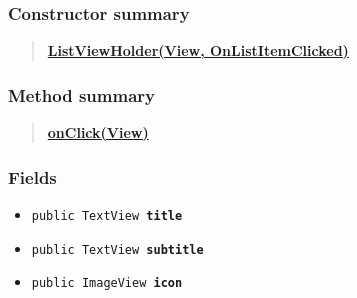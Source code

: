 \documentclass[11pt,a4paper]{report}
\begin{document}
{{{{{{{{{{{{{{{\subsubsection{Constructor summary}{
\begin{verse}
\hyperlink{edu.kit.pse17.go_app.RecyclerView.ListViewHolder(View, edu.kit.pse17.go_app.RecyclerView.OnListItemClicked)}{{\bf ListViewHolder(View, OnListItemClicked)}} \\
\end{verse}
}
\subsubsection{Method summary}{
\begin{verse}
\hyperlink{edu.kit.pse17.go_app.RecyclerView.ListViewHolder.onClick(View)}{{\bf onClick(View)}} \\
\end{verse}
}
\subsubsection{Fields}{
\begin{itemize}
\item{
\label{edu.kit.pse17.go_app.RecyclerView.ListViewHolder.title}\hypertarget{edu.kit.pse17.go_app.RecyclerView.ListViewHolder.title}{\texttt{public TextView\ {\bf  title}}
}
}
\item{
\label{edu.kit.pse17.go_app.RecyclerView.ListViewHolder.subtitle}\hypertarget{edu.kit.pse17.go_app.RecyclerView.ListViewHolder.subtitle}{\texttt{public TextView\ {\bf  subtitle}}
}
}
\item{
\label{edu.kit.pse17.go_app.RecyclerView.ListViewHolder.icon}\hypertarget{edu.kit.pse17.go_app.RecyclerView.ListViewHolder.icon}{\texttt{public ImageView\ {\bf  icon}}
}
}
\end{itemize}
}
}}}}}}}}}}}}}}}
\end{document}
